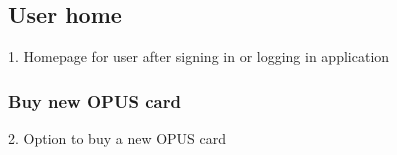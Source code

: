 \documentclass[a4paper,12pt]{article}
\begin{document}
\subsection{User home}
\begin{center}
\caption{1. Homepage for user after signing in or logging in application}
\end{center}

\subsubsection{Buy new OPUS card}
\begin{center}
\caption{2. Option to buy a new OPUS card}
\end{center}
\end{document}
